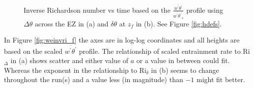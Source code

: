 \begin{figure}[htbp]
\begin{minipage}[b]{0.5\linewidth}
         
        \\
        \end{minipage}             
\quad
\begin{minipage}[b]{0.5\linewidth}
        \\
       
       \end{minipage}
        \caption[Richardson numbers based on $\frac{\overline{w^{'}\theta^{'}}}{\overline{w^{'}\theta^{'}}_{s}}$]{Inverse Richardson number vs time based on the $\frac{\overline{w^{'}\theta^{'}}}{\overline{w^{'}\theta^{'}}_{s}}$
profile using $\Delta \theta$ across the \acs{EZ} in (a) and $\delta \theta$ at $z_{f}$ in (b).  See Figure \ref{fig:hdefs}.}
        \label{fig:invristime_f}
\end{figure}

In Figure \ref{fig:weinvri_f} the axes are in log-log coordinates and all heights are based on the scaled $\overline{w^{'}\theta^{'}}$ profile. The relationship of scaled entrainment rate to \acs{Ri}$_{\Delta}$ in (a) shows scatter and either value of $a$ or a value in between could fit.  Whereas the exponent in the relationship to \acs{Ri}$_{\delta}$ in (b) seems to change throughout the run(s) and a value less (in magnitude) than $-1$ might fit better. \\    

